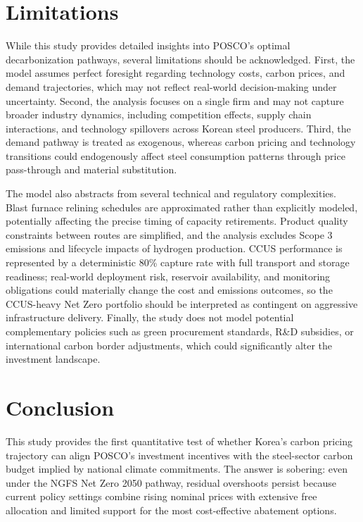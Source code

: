 \documentclass[preprint,1p,authoryear]{elsarticle}
\begin{document}
\section{Limitations}\label{sec:limitations}

While this study provides detailed insights into POSCO's optimal decarbonization pathways, several limitations should be acknowledged. First, the model assumes perfect foresight regarding technology costs, carbon prices, and demand trajectories, which may not reflect real-world decision-making under uncertainty. Second, the analysis focuses on a single firm and may not capture broader industry dynamics, including competition effects, supply chain interactions, and technology spillovers across Korean steel producers. Third, the demand pathway is treated as exogenous, whereas carbon pricing and technology transitions could endogenously affect steel consumption patterns through price pass-through and material substitution.

The model also abstracts from several technical and regulatory complexities. Blast furnace relining schedules are approximated rather than explicitly modeled, potentially affecting the precise timing of capacity retirements. Product quality constraints between routes are simplified, and the analysis excludes Scope 3 emissions and lifecycle impacts of hydrogen production. CCUS performance is represented by a deterministic 80\% capture rate with full transport and storage readiness; real-world deployment risk, reservoir availability, and monitoring obligations could materially change the cost and emissions outcomes, so the CCUS-heavy Net Zero portfolio should be interpreted as contingent on aggressive infrastructure delivery. Finally, the study does not model potential complementary policies such as green procurement standards, R\&D subsidies, or international carbon border adjustments, which could significantly alter the investment landscape.

\section{Conclusion}

This study provides the first quantitative test of whether Korea's carbon pricing trajectory can align POSCO's investment incentives with the steel-sector carbon budget implied by national climate commitments. The answer is sobering: even under the NGFS Net Zero 2050 pathway, residual overshoots persist because current policy settings combine rising nominal prices with extensive free allocation and limited support for the most cost-effective abatement options.
\end{document}
